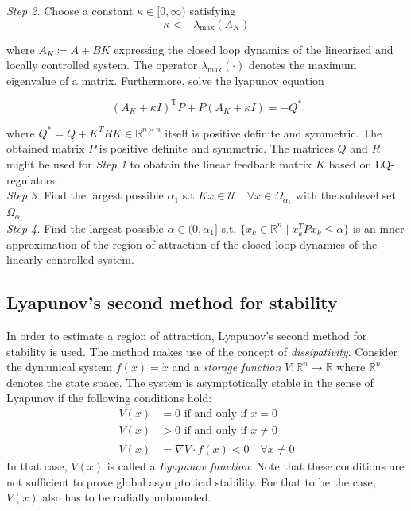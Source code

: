 \documentclass[10pt,a4paper,titlepage]{article}
\begin{document}
\textit{Step 2.} Choose a constant $\kappa \in [0,\infty)$ satisfying
\begin{equation}
	\kappa < -\lambda_{\text{max}}(A_K)
\end{equation}

where $A_K \coloneqq A + BK$ expressing the closed loop dynamics of the linearized and locally controlled system. The operator
$\lambda_{\text{max}}(\cdot)$ denotes the maximum eigenvalue of a matrix. Furthermore, solve the lyapunov equation

\begin{equation}
	\left(A_K+\kappa I\right)^{\mathrm{T}} P+P\left(A_K+\kappa I\right)=-Q^*
\end{equation}

where $Q^* = Q + K^T R K \in \mathbb{R}^{n \times n}$ itself is positive definite and symmetric. The obtained matrix $P$ is 
positive definite and symmetric. The matrices $Q$ and $R$ might be used for \textit{Step 1} to obatain the linear feedback
matrix $K$ based on LQ-regulators.\\

\textit{Step 3.} Find the largest possible $\alpha_1$ s.t $Kx \in \mathcal{U} \quad \forall x \in \Omega_{\alpha_1}$ with the sublevel set $\Omega_{\alpha_1}$\\

\textit{Step 4.} Find the largest possible $\alpha \in (0,\alpha_1]$ s.t. $\{x_k \in \mathbb{R}^n \mid x_k^TPx_k \leq \alpha \}$ is an 
inner approximation of the region of attraction of the closed loop dynamics of the linearly controlled system.


\subsection{Lyapunov's second method for stability}
\label{sec:lyapunov}
In order to estimate a region of attraction, Lyapunov's second method for stability is used. The method makes use of the concept of \textit{dissipativity}.
Consider the dynamical system $f(x) = \dot{x}$ and a \textit{storage function} $V: \mathbb{R}^n \rightarrow \mathbb{R}$ where $\mathbb{R}^n$ denotes the state space.
The system is asymptotically stable in the sense of Lyapunov if the following conditions hold: \cite{cunis_loureiro2023}
\begin{align}
	V(x) &= 0 \text{ if and only if } x=0\\
	V(x) &> 0 \text{ if and only if } x\neq0\\
	\dot{V}(x) &= \nabla V \cdot f(x) < 0 \quad \forall x \neq 0
\end{align}
In that case, $V(x)$ is called a \textit{Lyapunov function}. Note that these conditions are not sufficient to prove global asymptotical stability.
For that to be the case, $V(x)$ also has to be radially unbounded.
\end{document}
